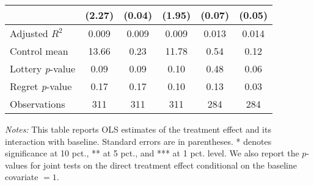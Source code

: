 \begin{table}[h]
{\begin{threeparttable}
\begin{tabular}{l*{5}{c}}
                &   (2.27)         &   (0.04)         &   (1.95)         &   (0.07)         &   (0.05)         \\
\midrule
Adjusted \(R^{2}\)&    0.009         &    0.009         &    0.009         &    0.013         &    0.014         \\
Control mean    &    13.66         &     0.23         &    11.78         &     0.54         &     0.12         \\
Lottery \emph{p}-value&     0.09         &     0.09         &     0.10         &     0.48         &     0.06         \\
Regret \emph{p}-value&     0.17         &     0.17         &     0.10         &     0.13         &     0.03         \\
Observations    &      311         &      311         &      311         &      284         &      284         \\
\bottomrule \end{tabular} \begin{tablenotes}[flushleft] \footnotesize \item \emph{Notes:} This table reports OLS estimates of the treatment effect and its interaction with baseline. Standard errors are in parentheses. * denotes significance at 10 pct., ** at 5 pct., and *** at 1 pct. level. We also report the \(p\)-values for joint tests on the direct treatment effect conditional on the baseline covariate $= 1$. \end{tablenotes} \end{threeparttable} } \end{table}

